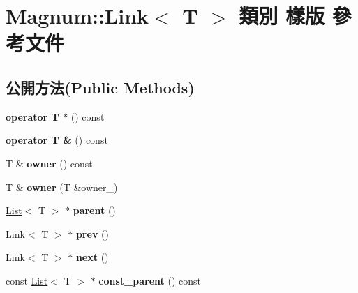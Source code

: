 \hypertarget{class_magnum_1_1_link}{}\section{Magnum\+:\+:Link$<$ T $>$ 類別 樣版 參考文件}
\label{class_magnum_1_1_link}
\subsection*{公開方法(Public Methods)}
\begin{DoxyCompactItemize}
\item 
{\bfseries operator T $\ast$} () const \hypertarget{class_magnum_1_1_link_aa526efddcee2f4743100eb9826a09e63}{}\label{class_magnum_1_1_link_aa526efddcee2f4743100eb9826a09e63}

\item 
{\bfseries operator T \&} () const \hypertarget{class_magnum_1_1_link_ab24af6536a86f61434237e665e2ea9c8}{}\label{class_magnum_1_1_link_ab24af6536a86f61434237e665e2ea9c8}

\item 
T \& {\bfseries owner} () const \hypertarget{class_magnum_1_1_link_a213064bf6ecc711cd0b86deff10bde7b}{}\label{class_magnum_1_1_link_a213064bf6ecc711cd0b86deff10bde7b}

\item 
T \& {\bfseries owner} (T \&owner\+\_\+)\hypertarget{class_magnum_1_1_link_ad9543255072c80b95ffd10799ff37d8e}{}\label{class_magnum_1_1_link_ad9543255072c80b95ffd10799ff37d8e}

\item 
\hyperlink{class_magnum_1_1_list}{List}$<$ T $>$ $\ast$ {\bfseries parent} ()\hypertarget{class_magnum_1_1_link_a513b7aeef39e43b9e777c01e8c57f421}{}\label{class_magnum_1_1_link_a513b7aeef39e43b9e777c01e8c57f421}

\item 
\hyperlink{class_magnum_1_1_link}{Link}$<$ T $>$ $\ast$ {\bfseries prev} ()\hypertarget{class_magnum_1_1_link_ae8e94d9a503c1f9ae6bdbfd280b94f10}{}\label{class_magnum_1_1_link_ae8e94d9a503c1f9ae6bdbfd280b94f10}

\item 
\hyperlink{class_magnum_1_1_link}{Link}$<$ T $>$ $\ast$ {\bfseries next} ()\hypertarget{class_magnum_1_1_link_a5238654c84727709372e166e927f5506}{}\label{class_magnum_1_1_link_a5238654c84727709372e166e927f5506}

\item 
const \hyperlink{class_magnum_1_1_list}{List}$<$ T $>$ $\ast$ {\bfseries const\+\_\+parent} () const \hypertarget{class_magnum_1_1_link_af53548a1b42468ab05a07853017565f1}{}\label{class_magnum_1_1_link_af53548a1b42468ab05a07853017565f1}


\end{DoxyCompactItemize}
